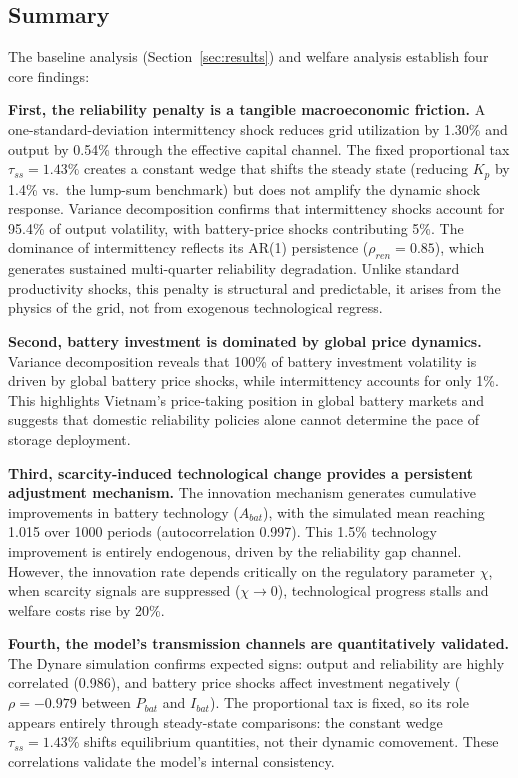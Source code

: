 \documentclass[12pt, a4paper]{article}
\begin{document}
	\subsection{Summary}

	The baseline analysis (Section~\ref{sec:results}) and welfare analysis establish four core findings:

	\textbf{First, the reliability penalty is a tangible macroeconomic friction.} A one-standard-deviation intermittency shock reduces grid utilization by 1.30\% and output by 0.54\% through the effective capital channel. The fixed proportional tax $\tau_{ss}=1.43\%$ creates a constant wedge that shifts the steady state (reducing $K_p$ by 1.4\% vs.\ the lump-sum benchmark) but does not amplify the dynamic shock response. Variance decomposition confirms that intermittency shocks account for 95.4\% of output volatility, with battery-price shocks contributing 5\%. The dominance of intermittency reflects its AR(1) persistence ($\rho_{ren}=0.85$), which generates sustained multi-quarter reliability degradation. Unlike standard productivity shocks, this penalty is structural and predictable, it arises from the physics of the grid, not from exogenous technological regress.

	\textbf{Second, battery investment is dominated by global price dynamics.} Variance decomposition reveals that 100\% of battery investment volatility is driven by global battery price shocks, while intermittency accounts for only 1\%. This highlights Vietnam's price-taking position in global battery markets and suggests that domestic reliability policies alone cannot determine the pace of storage deployment.

	\textbf{Third, scarcity-induced technological change provides a persistent adjustment mechanism.} The innovation mechanism generates cumulative improvements in battery technology ($A_{bat}$), with the simulated mean reaching 1.015 over 1000 periods (autocorrelation 0.997). This 1.5\% technology improvement is entirely endogenous, driven by the reliability gap channel. However, the innovation rate depends critically on the regulatory parameter $\chi$, when scarcity signals are suppressed ($\chi \to 0$), technological progress stalls and welfare costs rise by 20\%.

	\textbf{Fourth, the model's transmission channels are quantitatively validated.} The Dynare simulation confirms expected signs: output and reliability are highly correlated (0.986), and battery price shocks affect investment negatively ($\rho = -0.979$ between $P_{bat}$ and $I_{bat}$). The proportional tax is fixed, so its role appears entirely through steady-state comparisons: the constant wedge $\tau_{ss}=1.43\%$ shifts equilibrium quantities, not their dynamic comovement. These correlations validate the model's internal consistency.
\end{document}
